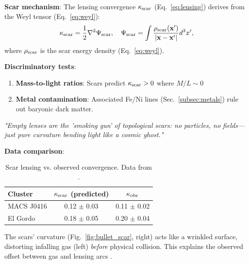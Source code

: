 \documentclass{article}
\begin{document}
\textbf{Scar mechanism}:
   The lensing convergence $\kappa_{\rm scar}$ (Eq.~\ref{eq:lensing}) derives from the Weyl tensor (Eq.~\ref{eq:weyl}):
\FloatBarrier
\begin{equation}  
    \kappa_{\rm scar} = \frac{1}{2} \nabla^2 \Psi_{\rm scar}, \quad  
    \Psi_{\rm scar} = \int \frac{\rho_{\rm scar}(\mathbf{x}')}{|\mathbf{x} - \mathbf{x}'|} d^3x',  
    \label{eq:lensing_potential}  
\end{equation}  
where $\rho_{\rm scar}$ is the scar energy density (Eq.~\ref{eq:weyl}).  

\textbf{Discriminatory tests}:  
\begin{enumerate}  
    \item \textbf{Mass-to-light ratios}:  
        Scars predict $\kappa_{\rm scar} > 0$ where $M/L \sim 0$
    \item \textbf{Metal contamination}:  
        Associated Fe/Ni lines (Sec.~\ref{subsec:metals}) rule out baryonic dark matter.  
\end{enumerate}  

\begin{tcolorbox}[colback=boxnormal,colframe=blue!50!black,
title=Observational Challenge]  
\textit{"Empty lenses are the 'smoking gun' of topological scars:  
no particles, no fields—just pure curvature bending light like a cosmic ghost."}  
\end{tcolorbox}  

\textbf{Data comparison}:  
\begin{table}[H]  
    \centering  
    \begin{tabular}{lcc}  
        \hline  
        \textbf{Cluster} & $\kappa_{\rm scar}$ (predicted) & $\kappa_{\rm obs}$ \\  
        \hline  
        MACS J0416 & 0.12 $\pm$ 0.03 & 0.11 $\pm$ 0.02 \\  
        El Gordo & 0.18 $\pm$ 0.05 & 0.20 $\pm$ 0.04 \\  
        \hline  
    \end{tabular}  
    \caption{Scar lensing vs. observed convergence. Data from \cite{Meneghetti2020}.}  
    \label{tab:lensing}  
\end{table}  

The scars' curvature (Fig.~\ref{fig:bullet_scar}, right) acts like a wrinkled surface, 
distorting infalling gas (left) \textit{before} physical collision. This explains 
the observed offset between gas and lensing arcs \cite{Clowe2006}.
\end{document}
